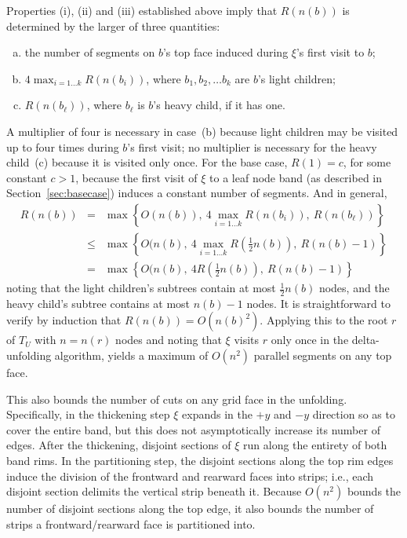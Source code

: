 \documentclass[11pt]{article}
\begin{document}
Properties (i), (ii) and (iii) established above imply that $R(n(b))$ is determined
by the larger of three quantities:
\begin{enumerate}[(a)]
\item the number of  segments on $b$'s top face induced during $\xi$'s
first visit to $b$;
\item $4\max_{i=1\dots k} R(n(b_i))$, where $b_1, b_2,\dots b_k$ are $b$'s
light
children;
\item $R(n(b_\ell))$, where $b_\ell$ is $b$'s heavy child, if it has one.
\end{enumerate}
A multiplier of four is necessary in case~(b) because light children may be visited up to four times during $b$'s first visit; no multiplier is
necessary for the heavy child~(c) because it is visited only once. For the base case,
$R(1) = c$, for some constant $c > 1$, because the first visit of $\xi$ to
a leaf node band (as described in Section~\ref{sec:basecase}) induces a constant
number of  segments.
And in general,
\begin{eqnarray*}
 R(n(b)) & = & \max \left\{O(n(b)), ~4\max_{i=1\dots k} R(n(b_i)) , ~R(n(b_\ell))\right\} \\
            &  \leq & \max \left\{O(n(b), ~4\max_{i=1\dots k} R\left( {\textstyle \frac{1}{2}} n(b) \right), ~R(n(b)-1) \right\} \\
            &  = & \max \left\{O(n(b), ~4R\left( {\textstyle \frac{1}{2}}n(b) \right), ~R(n(b)-1) \right\}
\end{eqnarray*}
noting that the light children's subtrees contain at most $\frac{1}{2}n(b)$ nodes,
and the heavy child's subtree contains at most $n(b)-1$ nodes. It is
straightforward to verify by induction that $R(n(b)) = O(n(b)^2)$.
Applying this to the root $r$ of $T_U$ with $n = n(r)$ nodes
and noting that $\xi$ visits $r$ only once in the delta-unfolding
algorithm,
yields a maximum of $O(n^2)$  parallel segments on any top face.

This also bounds the number of cuts on any grid face in the unfolding.
Specifically, in the thickening step $\xi$ expands in the $+y$ and $-y$
direction so as to cover the entire band, but this does not asymptotically
increase its number of edges.
After the thickening, disjoint sections of
$\xi$ run along the entirety of both band rims. In the partitioning
step, the disjoint sections along the top rim edges
induce the division of the frontward and rearward faces into strips;
i.e., each disjoint section delimits the vertical strip beneath it. Because $O(n^2)$
bounds the number of disjoint sections along the top edge, it also bounds the number of strips
a frontward/rearward face is partitioned into.
\end{document}
